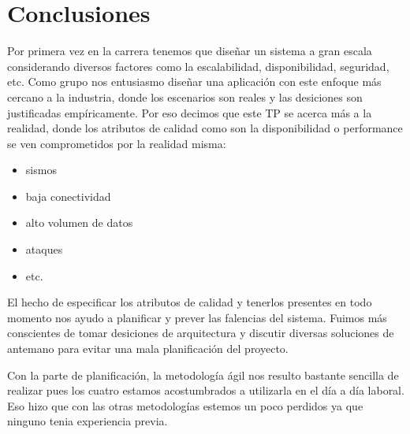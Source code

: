 \section{Conclusiones}

Por primera vez en la carrera tenemos que diseñar un sistema a gran escala considerando diversos
factores como la escalabilidad, disponibilidad, seguridad, etc. Como grupo nos entusiasmo diseñar una
aplicación con este enfoque más cercano a la industria, donde los escenarios son reales y
las desiciones son justificadas empíricamente. Por eso decimos que este TP se acerca más
a la realidad, donde los atributos de calidad como son la disponibilidad o performance se
ven comprometidos por la realidad misma: 

\begin{itemize}
  \item sismos
  \item baja conectividad
  \item alto volumen de datos
  \item ataques
  \item etc.  
\end{itemize}

El hecho de especificar los atributos de calidad y tenerlos presentes en todo momento nos
 ayudo a planificar y prever las falencias del sistema. Fuimos más conscientes de 
tomar desiciones de arquitectura y discutir diversas soluciones de antemano para 
evitar una mala planificación del proyecto.

Con la parte de planificación, la metodología ágil nos resulto bastante sencilla 
de realizar pues los cuatro estamos acostumbrados a utilizarla en el día a día 
laboral. Eso hizo que con las otras metodologías estemos un poco perdidos ya que 
ninguno tenia experiencia previa.